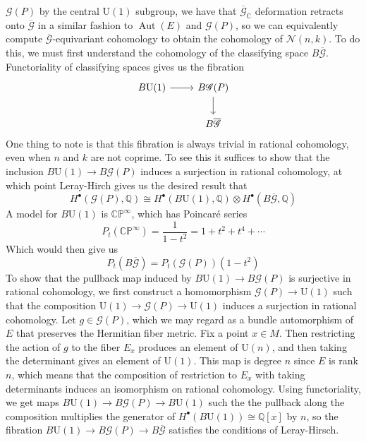 \documentclass[psamsfonts, 12pt]{amsart}
\theoremstyle{definition}
\theoremstyle{remark}
\newcommand{\Q}{\mathbb{Q}}
\newcommand{\C}{\mathbb{C}}
\newcommand{\CP}{\mathbb{CP}}
\DeclareMathOperator{\Aut}{Aut}
\begin{document}
$\mathscr{G}(P)$ by the central $\mathrm{U}(1)$ subgroup, we have that
$\overline{\mathscr{G}}_\C$ deformation retracts onto $\overline{\mathscr{G}}$
in a similar fashion to $\Aut(E)$ and $\mathscr{G}(P)$, so we can equivalently
compute $\overline{\mathscr{G}}$-equivariant cohomology to obtain the cohomology
of $\mathcal{N}(n,k)$. To do this, we must first understand the cohomology
of the classifying space $B\overline{\mathscr{G}}$. Functoriality of classifying
spaces gives us the fibration
\[\begin{tikzcd}
B\mathrm{U}(1) \ar[r] & B\mathscr{G}(P) \ar[d] \\
& B\overline{\mathscr{G}}
\end{tikzcd}\]
One thing to note is that this fibration is always trivial in rational cohomology,
even when $n$ and $k$ are not coprime. To see this it suffices to show that
the inclusion $B\mathrm{U}(1) \to B\mathscr{G}(P)$ induces a surjection in rational
cohomology, at which point Leray-Hirch gives us the desired result that
\[
H^\bullet(\mathscr{G}(P), \Q)
\cong H^\bullet(B \mathrm{U}(1),\Q) \otimes H^\bullet(B\overline{\mathscr{G}},\Q)
\]
A model for $B\mathrm{U}(1)$ is $\CP^\infty$, which has Poincar\'e series
\[
P_t(\CP^\infty) = \frac{1}{1-t^2}  = 1 + t^2 + t^4 + \cdots
\]
Which would then give us
\[
P_t(B\overline{\mathscr{G}}) = P_t(\mathscr{G}(P))(1-t^2)
\]
To show that the pullback map induced by $B\mathrm{U}(1) \to B\mathscr{G}(P)$ is
surjective in rational cohomology, we first construct a homomorphism
$\mathscr{G}(P) \to \mathrm{U}(1)$ such that the composition
$\mathrm{U}(1) \to \mathscr{G}(P) \to \mathrm{U}(1)$ induces a surjection in
rational cohomology. Let $g \in \mathscr{G}(P)$, which we may regard as a bundle
automorphism of $E$ that preserves the Hermitian fiber metric. Fix a point $x \in M$.
Then restricting the action of $g$ to the fiber $E_x$ produces an element of
$\mathrm{U}(n)$, and then taking the determinant gives an element of
$\mathrm{U}(1)$. This map is degree $n$ since $E$ is rank $n$, which means that the
composition of restriction to $E_x$ with taking determinants induces an isomorphism on
rational cohomology. Using functoriality, we get maps
$B\mathrm{U}(1) \to B\mathscr{G}(P) \to B\mathrm{U}(1)$ such the the pullback along
the composition multiplies the generator of
$H^\bullet(B\mathrm{U}(1)) \cong \Q[x]$ by $n$, so the fibration
$B\mathrm{U}(1) \to B\mathscr{G}(P) \to B\overline{\mathscr{G}}$ satisfies the
conditions of Leray-Hirsch. \\
\end{document}

